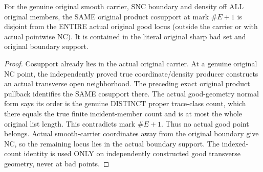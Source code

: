 \begin{theorem}
\label{hir:sharp-original-deep-product-cosupport-avoids-whole-good-region}
\leanok
For the genuine original smooth carrier, SNC boundary and density off ALL original members, the SAME original product cosupport at mark $\#E+1$ is disjoint from the ENTIRE actual original good locus (outside the carrier or with actual pointwise NC). It is contained in the literal original sharp bad set and original boundary support.
\end{theorem}
\begin{proof}
Cosupport already lies in the actual original carrier. At a genuine original NC point, the independently proved true coordinate/density producer constructs an actual transverse open neighborhood. The preceding exact original product pullback identifies the SAME cosupport there. The actual good-geometry normal form says its order is the genuine DISTINCT proper trace-class count, which there equals the true finite incident-member count and is at most the whole original list length. This contradicts mark $\#E+1$. Thus no actual good point belongs. Actual smooth-carrier coordinates away from the original boundary give NC, so the remaining locus lies in the actual boundary support. The indexed-count identity is used ONLY on independently constructed good transverse geometry, never at bad points.
\end{proof}

